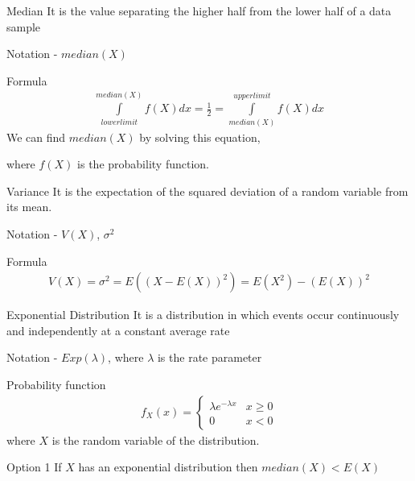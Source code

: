 \documentclass{beamer}
\begin{document}
\begin{frame}{}
\begin{block}{Median}
It is the value separating the higher half from the lower half of a data sample

Notation - $median(X)$
\end{block}
\begin{block}{Formula}
\begin{align}
    \int\limits_{lower limit}^{median(X)}f(X)d x=\frac{1}{2}=\int\limits_{median(X)}^{upper limit}f(X)d x
\end{align}
We can find $median(X)$ by solving this equation,

where $f(X)$ is the probability function.
\end{block}
\end{frame}
\begin{frame}{}
\begin{block}{Variance}
It is the expectation of the squared deviation of a random variable from its mean.

Notation - $V(X)$, $\sigma^2$
\end{block}
\begin{block}{Formula}
\begin{align}
    V(X)=\sigma^2=E((X-E(X))^2)=E(X^2)-(E(X))^2
\end{align}
\end{block}
\end{frame}
\begin{frame}{}
    \begin{block}{Exponential Distribution}
    It is a distribution in which events occur continuously and independently at a constant average rate
    
    Notation - $Exp(\lambda)$, where $\lambda$ is the rate parameter
    \end{block}
    \begin{block}{Probability function}
    \begin{align}
        f_X(x)=
        \begin{cases}
            \lambda e^{-\lambda x} & x\geq0\\
            0 & x<0
        \end{cases}
    \end{align}
    where $X$ is the random variable of the distribution.
    \end{block}
\end{frame}
\begin{frame}{Option 1}
    If $X$ has an exponential distribution then $median(X)<E(X)$
\end{frame}
\end{document}
